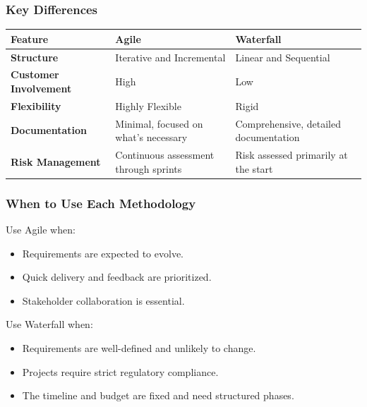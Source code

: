 \documentclass{beamer}
\begin{document}
\begin{frame}[fragile]
    \frametitle{Key Differences}
    \begin{tabular}{|l|l|l|}
        \hline
        \textbf{Feature} & \textbf{Agile} & \textbf{Waterfall} \\
        \hline
        \textbf{Structure} & Iterative and Incremental & Linear and Sequential \\
        \hline
        \textbf{Customer Involvement} & High & Low \\
        \hline
        \textbf{Flexibility} & Highly Flexible & Rigid \\
        \hline
        \textbf{Documentation} & Minimal, focused on what's necessary & Comprehensive, detailed documentation \\
        \hline
        \textbf{Risk Management} & Continuous assessment through sprints & Risk assessed primarily at the start \\
        \hline
    \end{tabular}
\end{frame}

\begin{frame}[fragile]
    \frametitle{When to Use Each Methodology}
    \begin{block}{Use Agile when:}
        \begin{itemize}
            \item Requirements are expected to evolve.
            \item Quick delivery and feedback are prioritized.
            \item Stakeholder collaboration is essential.
        \end{itemize}
    \end{block}
    
    \begin{block}{Use Waterfall when:}
        \begin{itemize}
            \item Requirements are well-defined and unlikely to change.
            \item Projects require strict regulatory compliance.
            \item The timeline and budget are fixed and need structured phases.
        \end{itemize}
    \end{block}
\end{frame}
\end{document}
